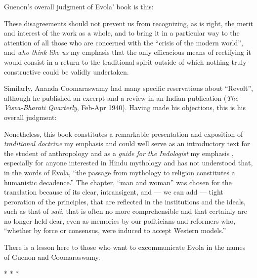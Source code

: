 Guenon's overall judgment of Evola' book is this:

\begin{quotex} 
These disagreements should not prevent us from recognizing, as is right, the merit and interest of the work as a whole, and to bring it in a particular way to the attention of all those who are concerned with the ``crisis of the modern world'', and \emph{who think like us} my emphasis that the only efficacious means of rectifying it would consist in a return to the traditional spirit outside of which nothing truly constructive could be validly undertaken.
\end{quotex}


Similarly, Ananda Coomaraswamy had many specific reservations about ``Revolt'', although he published an excerpt and a review in an Indian publication (\emph{The Visva-Bharati Quarterly}, Feb-Apr 1940). Having made his objections, this is his overall judgment:

\begin{quotex}
Nonetheless, this book constitutes a remarkable presentation and exposition of \emph{traditional doctrine} my emphasis and could well serve as an introductory text for the student of anthropology and as a \emph{guide for the Indologist} my emphasis , especially for anyone interested in Hindu mythology and has not understood that, in the words of Evola, ``the passage from mythology to religion constitutes a humanistic decadence.'' The chapter, ``man and woman'' was chosen for the translation because of its clear, intransigent, and --- we can add --- tight peroration of the principles, that are reflected in the institutions and the ideals, such as that of \emph{sati}, that is often no more comprehensible and that certainly are no longer held dear, even as memories by our politicians and reformers who, ``whether by force or consensus, were induced to accept Western models.''
\end{quotex}


There is a lesson here to those who want to excommunicate Evola in the names of Guenon and Coomaraswamy.



\begin{center}* * *\end{center}


